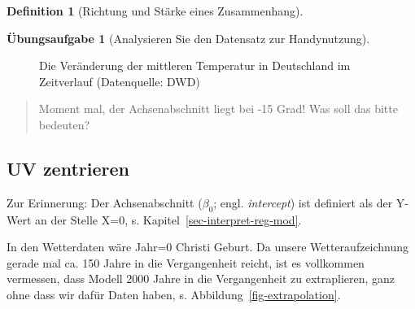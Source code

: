 \documentclass[
  a4paper,
  DIV=11]{scrreprt}
\theoremstyle{definition}
\newtheorem{exercise}{Übungsaufgabe}[chapter]
\theoremstyle{definition}
\theoremstyle{definition}
\newtheorem{definition}{Definition}[chapter]
\theoremstyle{remark}
\begin{document}
\begin{definition}[Richtung und Stärke eines
Zusammenhang]
\begin{exercise}[Analysieren Sie den Datensatz zur
Handynutzung]
\begin{figure}
\begin{minipage}{0.50\linewidth}
{}


\end{minipage}%
%
\begin{minipage}{0.50\linewidth}



\end{minipage}%

\caption{\label{fig-wetter1}Die Veränderung der mittleren Temperatur in
Deutschland im Zeitverlauf (Datenquelle: DWD)}

\end{figure}%

\begin{quote}
{} Moment mal, der Achsenabschnitt liegt bei -15 Grad!
Was soll das bitte bedeuten?
\end{quote}

\subsection{UV zentrieren}\label{uv-zentrieren}

Zur Erinnerung: Der Achsenabschnitt (\(\beta_0\); engl.
\emph{intercept}) ist definiert als der Y-Wert an der Stelle X=0, s.
Kapitel~\ref{sec-interpret-reg-mod}.

In den Wetterdaten wäre Jahr=0 Christi Geburt. Da unsere
Wetteraufzeichnung gerade mal ca. 150 Jahre in die Vergangenheit reicht,
ist es vollkommen vermessen, dass Modell 2000 Jahre in die Vergangenheit
zu extraplieren, ganz ohne dass wir dafür Daten haben, s.
Abbildung~\ref{fig-extrapolation}.


\end{exercise}
\end{definition}
\end{document}
